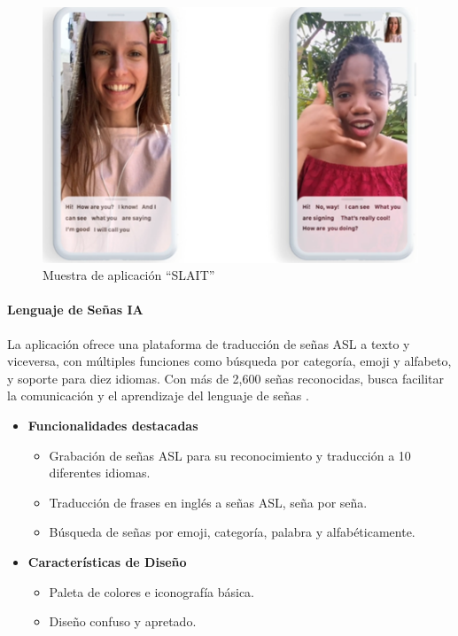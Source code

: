 \begin{figure} [H]
    \centering
    \includegraphics[width=0.5\linewidth]{figuras/slait.png}
    \caption{Muestra de aplicación “SLAIT”}
    \label{fig:enter-label}
\end{figure}

\paragraph{Lenguaje de Señas IA}

La aplicación ofrece una plataforma de traducción de señas ASL a texto y viceversa, con múltiples funciones como búsqueda por categoría, emoji y alfabeto, y soporte para diez idiomas. Con más de 2,600 señas reconocidas, busca facilitar la comunicación y el aprendizaje del lenguaje de señas \cite{LenguajeDeSeñasIA}.

\begin{itemize}
    \item \textbf{Funcionalidades destacadas}
    \begin{itemize}
        \item Grabación de señas ASL para su reconocimiento y traducción a 10 diferentes idiomas.
        \item Traducción de frases en inglés a señas ASL, seña por seña.
        \item Búsqueda de señas por emoji, categoría, palabra y alfabéticamente.
    \end{itemize}

    \item \textbf{Características de Diseño}
    \begin{itemize}
        \item Paleta de colores e iconografía básica.
        \item Diseño confuso y apretado.
    \end{itemize}
\end{itemize}


